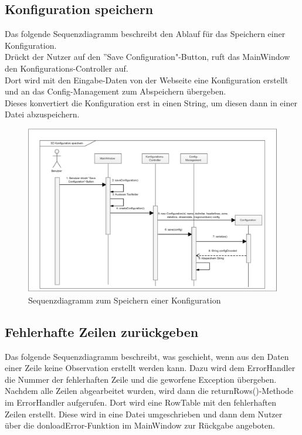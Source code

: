 \subsection{Konfiguration speichern}
Das folgende Sequenzdiagramm beschreibt den Ablauf für das Speichern einer Konfiguration.\\
Drückt der Nutzer auf den ”{Save Configuration}"{-Button}, ruft das MainWindow den Konfigurations-Controller auf.\\
Dort wird mit den Eingabe-Daten von der Webseite eine Konfiguration erstellt und an das Config-Management zum Abspeichern übergeben.\\
Dieses konvertiert die Konfiguration erst in einen String, um diesen dann in einer Datei abzuspeichern.
\vspace{\fill}
\begin{figure}[htbp]
\centering
\includegraphics[scale=0.5]{uml/eps/SD_saveConfig.eps}
\caption{Sequenzdiagramm zum Speichern einer Konfiguration}
\end{figure}

\vspace{\fill}
\clearpage
\subsection{Fehlerhafte Zeilen zurückgeben}
Das folgende Sequenzdiagramm beschreibt, was geschieht, wenn aus den Daten einer Zeile keine Observation erstellt werden kann.
Dazu wird dem ErrorHandler die Nummer der fehlerhaften Zeile und die geworfene Exception übergeben.\\
Nachdem alle Zeilen abgearbeitet wurden, wird dann die returnRows()-Methode im ErrorHandler aufgerufen.
Dort wird eine RowTable mit den fehlerhaften Zeilen erstellt.
Diese wird in eine Datei umgeschrieben und dann dem Nutzer über die donloadError-Funktion im MainWindow zur Rückgabe angeboten.

